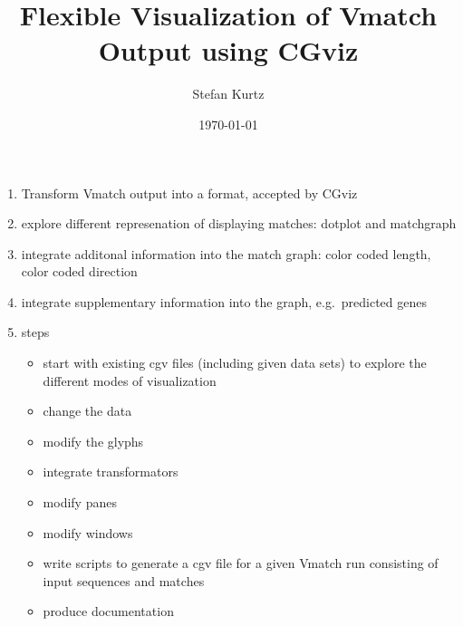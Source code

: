 \documentclass[12pt]{article}
\title{Flexible Visualization of Vmatch Output using CGviz}
\author{Stefan Kurtz}
\date{\today}
\begin{document}
\maketitle
\begin{enumerate}
\item
Transform Vmatch output into a format, accepted by CGviz
\item
explore different represenation of displaying matches: dotplot and matchgraph
\item
integrate additonal information into the match graph:
color coded length, color coded direction
\item
integrate supplementary information into the graph, e.g.\ predicted 
genes
\item
steps
\begin{itemize}
\item
start with existing cgv files (including given data sets) to explore the
different modes of visualization
\item
change the data
\item
modify the glyphs
\item
integrate transformators
\item
modify panes
\item
modify windows
\item
write scripts to generate a cgv file for a given Vmatch run
consisting of input sequences and matches
\item
produce documentation
\end{itemize}
\end{enumerate}
\end{document}
